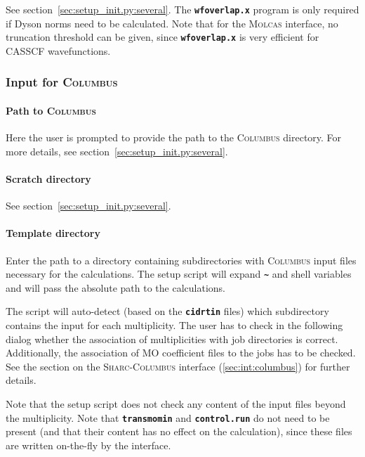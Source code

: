 \documentclass[a4paper,10pt,DIV=15,openany,twoside=false]{scrbook}
\newcommand{\sharc}{\textsc{Sharc}}
\newcommand{\ttt}[1]{\textbf{\texttt{#1}}}
\begin{document}
See section~\ref{sec:setup_init.py:several}. The \ttt{wfoverlap.x} program is only required if Dyson norms need to be calculated. Note that for the \textsc{Molcas} interface, no truncation threshold can be given, since \ttt{wfoverlap.x} is very efficient for CASSCF wavefunctions.


\subsubsection{Input for \textsc{Columbus}}\label{sec:setup_init.py:columbus}

\paragraph{Path to \textsc{Columbus}}

Here the user is prompted to provide the path to the \textsc{Columbus} directory. 
For more details, see section~\ref{sec:setup_init.py:several}.

\paragraph{Scratch directory}

See section~\ref{sec:setup_init.py:several}.

\paragraph{Template directory}

Enter the path to a directory containing subdirectories with \textsc{Columbus} input files necessary for the calculations. The setup script will expand \ttt{\textasciitilde} and shell variables and will pass the absolute path to the calculations.

The script will auto-detect (based on the \ttt{cidrtin} files) which subdirectory contains the input for each multiplicity. The user has to check in the following dialog whether the association of multiplicities with job directories is correct. Additionally, the association of MO coefficient files to the jobs has to be checked. See the section on the \sharc-\textsc{Columbus} interface (\ref{sec:int:columbus}) for further details. 

Note that the setup script does not check any content of the input files beyond the multiplicity. Note that \ttt{transmomin} and \ttt{control.run} do not need to be present (and that their content has no effect on the calculation), since these files are written on-the-fly by the interface. 
\end{document}
